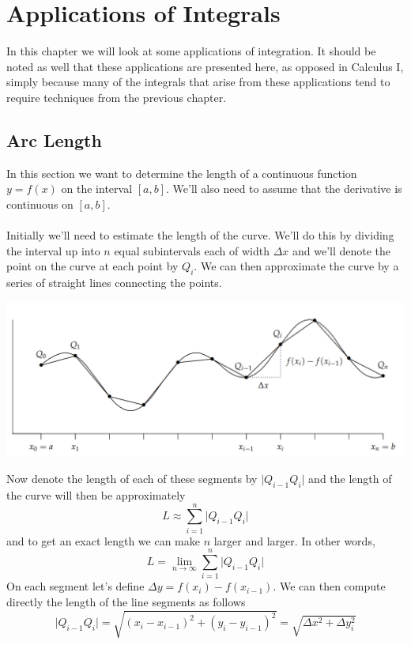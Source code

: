\documentclass[10pt,reqno]{book}
\theoremstyle{definition}
\begin{document}
	\chapter{Applications of Integrals}
	
	In this chapter we will look at some applications of integration. It should be noted as well that these applications are presented here, as opposed in Calculus I, simply because many of the integrals that arise from these applications tend to require techniques from the previous chapter.
	
	\section{Arc Length}
	
	In this section we want to determine the length of a continuous function $ y = f(x) $ on the interval $ [a,b] $. We'll also need to assume that the derivative is continuous on $ [a,b] $.\\ \\
	Initially we'll need to estimate the length of the curve. We'll do this by dividing the interval up into $ n $ equal subintervals each of width $ \Delta x $ and we'll denote the point on the curve at each point by $ Q_i $. We can then approximate the curve by a series of straight lines connecting the points.
	\begin{center}
		\includegraphics[scale=0.325]{arc.png}
	\end{center}
	Now denote the length of each of these segments by $ \big| Q_{i-1} Q_i \big| $ and the length of the curve will then be approximately 
	\[ L \approx \sum\limits_{i=1}^{n} \big| Q_{i-1} Q_i \big| \]
	and to get an exact length we can make $ n $ larger and larger. In other words,
	\[ L = \lim\limits_{n \to \infty} \sum\limits_{i=1}^{n} \big| Q_{i-1} Q_i \big| \]
	On each segment let's define $ \Delta y = f(x_i) - f(x_{i-1}) $. We can then compute directly the length of the line segments as follows
	\[ \big| Q_{i-1} Q_i \big| = \sqrt{(x_i - x_{i-1})^2 + (y_i - y_{i-1})^2} = \sqrt{\Delta x^2 + \Delta y_i^2} \]
\end{document}
